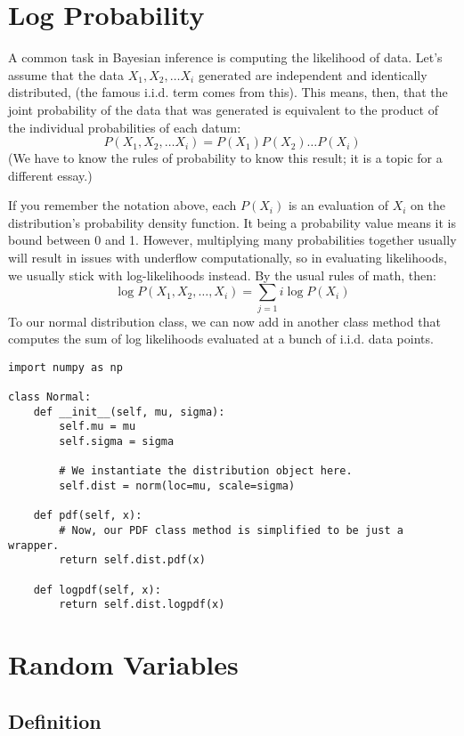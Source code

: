 \section{Log Probability}

A common task in Bayesian inference is computing the likelihood of data. Let's assume that the data $X_1,X_2,\ldots X_i$ generated are independent and identically distributed, (the famous i.i.d. term comes from this). This means, then, that the joint probability of the data that was generated is equivalent to the product of the individual probabilities of each datum:
\begin{equation}
P(X_1,X_2,\ldots X_i)=P(X_1)P(X_2)\ldots P(X_i)
\end{equation}
(We have to know the rules of probability to know this result; it is a topic for a different essay.)

If you remember the notation above, each $P(X_i)$ is an evaluation of $X_i$ 
on the distribution's probability density function. It being a probability value means it is bound between 0 and 1. However, multiplying many probabilities together usually will result in issues with underflow computationally, so in evaluating likelihoods, we usually stick with log-likelihoods instead. By the usual rules of math, then:
\begin{equation}
\log P(X_1,X_2,\ldots ,X_i)=\sum_{j=1}{i}\log P(X_i)
\end{equation}
To our normal distribution class, we can now add in another class method that computes the sum of log likelihoods evaluated at a bunch of i.i.d. data points.

\begin{lstlisting}
import numpy as np

class Normal:
    def __init__(self, mu, sigma):
        self.mu = mu
        self.sigma = sigma

        # We instantiate the distribution object here.
        self.dist = norm(loc=mu, scale=sigma)

    def pdf(self, x):
        # Now, our PDF class method is simplified to be just a wrapper.
        return self.dist.pdf(x)

    def logpdf(self, x):
        return self.dist.logpdf(x)
\end{lstlisting}

\section{Random Variables}
\subsection{Definition}

